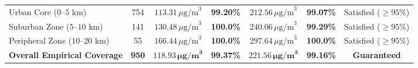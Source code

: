 \begin{table}[t]
\begin{tabular}{lcccccc}
\midrule
Urban Core ($0$--$5\text{ km}$) & 754 & $113.31\,\mu\text{g/m}^3$ & \textbf{99.20\%} & $212.56\,\mu\text{g/m}^3$ & \textbf{99.07\%} & Satisfied ($\ge 95\%$) \\
Suburban Zone ($5$--$10\text{ km}$) & 141 & $130.48\,\mu\text{g/m}^3$ & \textbf{100.0\%} & $240.06\,\mu\text{g/m}^3$ & \textbf{99.29\%} & Satisfied ($\ge 95\%$) \\
Peripheral Zone ($10$--$20\text{ km}$) & 55 & $166.44\,\mu\text{g/m}^3$ & \textbf{100.0\%} & $297.64\,\mu\text{g/m}^3$ & \textbf{100.0\%} & Satisfied ($\ge 95\%$) \\
\textbf{Overall Empirical Coverage} & \textbf{950} & $\mathbf{118.93\,\mu\text{g/m}^3}$ & \textbf{99.37\%} & $\mathbf{221.56\,\mu\text{g/m}^3}$ & \textbf{99.16\%} & \textbf{Guaranteed} \\
\bottomrule
\end{tabular}
\end{table}
